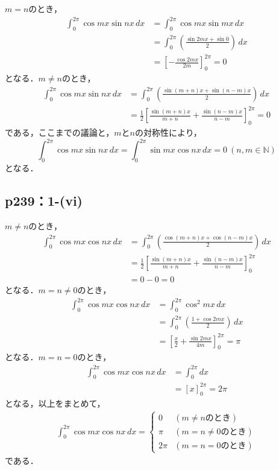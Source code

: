 \documentclass[a4paper,10pt,fleqn]{ltjsarticle}
\begin{document}
	\begin{screen}
		$m=n$のとき，
		\begin{align*}
			\int_{0}^{2\pi} \cos m x \sin nx \, dx & = \int_{0}^{2\pi} \cos mx \sin mx \, dx \\
			& = \int_{0}^{2\pi} \left (\frac{\sin 2mx + \sin 0}{2}\right ) \, dx \\
			& = \left [-\frac{\cos 2mx}{2m}\right ]_{0}^{2\pi} =0
		\end{align*}
		となる．$m \ne n$のとき，
		\begin{align*}
			\int_{0}^{2\pi} \cos mx \sin nx \, dx & = \int_{0}^{2\pi} \left (\frac{\sin (m+n)x + \sin (n-m)x}{2}\right) \, dx \\
			& = \frac{1}{2}\left [\frac{\sin (m+n)x}{m+n}+\frac{\sin (n-m)x}{n-m} \right]_{0}^{2\pi} =0
		\end{align*}
		である，ここまでの議論と，$m$と$n$の対称性により，
			\[
				\int_{0}^{2\pi} \cos mx \sin nx \, dx =\int_{0}^{2\pi} \sin mx \cos nx \, dx =0 ~(n,m \in \mathbb{N})
			\]
		となる．
	\end{screen}


\subsection*{p239：1-(vi)}
	\begin{screen}
		$m \ne n$のとき，
		\begin{align*}
			\int_{0}^{2\pi} \cos mx \cos nx \, dx & = \int_{0}^{2\pi} \left (\frac{\cos(m+n)x+\cos(n-m)x}{2}\right) \, dx\\
			& = \frac{1}{2} \left [\frac{\sin (m+n)x}{m+n}+\frac{\sin(n-m)x}{n-m}\right]_{0}^{2\pi} \\
			& = 0-0 =0
		\end{align*}
		となる．$m =n \ne 0$のとき，
		\begin{align*}
			\int_{0}^{2\pi} \cos mx \cos nx \, dx & = \int_{0}^{2\pi} \cos^2 mx \, dx \\
			& = \int_{0}^{2\pi} \left (\frac{1+\cos 2mx}{2}\right) \, dx  \\
			& = \left [\frac{x}{2}+\frac{\sin 2mx}{4m}\right]_{0}^{2\pi} = \pi
		\end{align*}
		となる．$m =n =0$のとき，
		\begin{align*}
			\int_{0}^{2\pi} \cos mx \cos nx \, dx & = \int_{0}^{2\pi} dx \\
			& = [x]_{0}^{2\pi} = 2\pi
		\end{align*}
		となる，以上をまとめて，
		\begin{align*}
			\int_{0}^{2\pi} \cos mx \cos nx \, dx =
			\begin{cases}
				0 & (m \ne n のとき)\\
				\pi & (m = n\ne 0のとき)\\
				2 \pi & (m=n=0 のとき)
			\end{cases}
		\end{align*}
		である．
	\end{screen}
\end{document}
